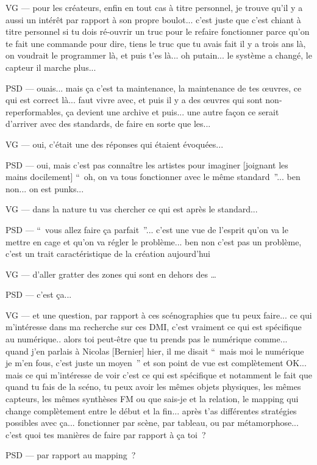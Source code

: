VG — pour les créateurs, enfin en tout cas à titre personnel,  je trouve qu'il y a aussi un intérêt par rapport à son propre boulot... c'est juste que c'est chiant à titre personnel si tu dois ré-ouvrir un truc pour le refaire fonctionner parce qu'on te fait une commande pour dire, tiens le truc que tu avais fait il y a trois ans là, on voudrait le programmer là, et puis t'es là... oh putain... le système a changé, le capteur il marche plus... 

PSD — ouais... mais ça c'est ta maintenance, la maintenance de tes œuvres, ce qui est correct là... faut vivre avec, et puis il y a des œuvres qui sont non-reperformables, ça devient une archive et puis... une autre façon ce serait d'arriver avec des standards, de faire en sorte que les... 

VG — oui, c'était une des réponses qui étaient évoquées... 

PSD — oui, mais c'est pas connaître les artistes pour imaginer [joignant les mains docilement] “ oh, on va tous fonctionner avec le même standard ”... ben non... on est punks... 

VG — dans la nature tu vas chercher ce qui est après le standard... 

PSD — “ vous allez faire ça parfait ”... c'est une vue de l'esprit qu'on va le mettre en cage et qu'on va régler le problème... ben non c'est pas un problème, c'est un trait caractéristique de la création aujourd'hui 

VG — d'aller gratter des zones qui sont en dehors des … 

PSD — c'est ça... 

VG — et une question, par rapport à ces scénographies que tu peux faire... ce qui m'intéresse dans ma recherche sur ces DMI, c'est vraiment ce qui est spécifique au numérique.. alors toi peut-être que tu prends pas le numérique comme... quand j'en parlais à Nicolas [Bernier] hier, il me disait “ mais moi le numérique je m'en fous, c'est juste un moyen ” et son point de vue est complètement OK... mais ce qui m'intéresse de voir c'est ce qui est spécifique et notamment le fait que quand tu fais de la scéno, tu peux avoir les mêmes objets physiques, les mêmes capteurs, les mêmes synthèses FM ou que sais-je et la relation, le mapping qui change complètement entre le début et la fin... après t'as différentes stratégies possibles avec ça... fonctionner par scène, par tableau, ou par métamorphose... c'est quoi tes manières de faire par rapport à ça toi ? 

PSD — par rapport au mapping ? 

